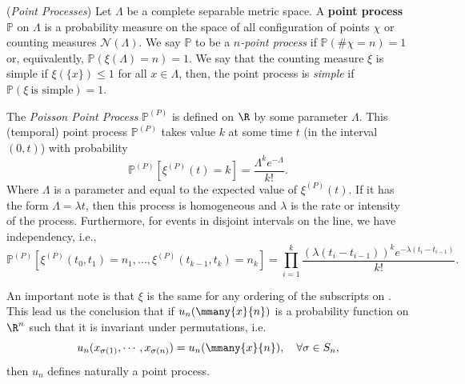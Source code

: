 \begin{definicao} (\textit{Point Processes})
	Let $\Lambda$ be a complete separable metric space. A \textbf{point process} $\mathbb{P}$ on $\Lambda$ is a probability measure on the space of all configuration of points $\chi$ or counting measures $\mathcal{N}(\Lambda)$. We say $\mathbb{P}$ to be a \textit{$n$-point process} if  $\mathbb{P}(\# \chi = n) = 1$ or, equivalently, $\mathbb{P}(\xi(\Lambda) = n)  = 1$. We say that the counting measure $\xi$ is simple if $\xi(\{x\}) \leq 1$ for all $x \in \Lambda$, then, the point process is \textit{simple} if $\mathbb{P}( \xi \ \text{is simple}) = 1$.
	\label{Definition: Point Process}
\end{definicao}

\begin{exemplo}
The \textit{Poisson Point Process} $\mathbb{P}^{(P)}$ is defined on $\R$ by some parameter $\Lambda$. This (temporal) point process $\mathbb{P}^{(P)}$ takes value $k$ at some time $t$ (in the interval $(0,t)$) with probability
\begin{equation}
	\mathbb{P}^{(P)}[\xi^{(P)}(t) = k] = \frac{\Lambda^k e^{-\Lambda}}{k!}.
\end{equation}
Where $\Lambda$ is a parameter and equal to the expected value of $\xi^{(P)}(t)$. If it has the form $\Lambda = \lambda t$, then this process is homogeneous and $\lambda$ is the rate or intensity of the process.  Furthermore, for events in disjoint intervals on the line, we have independency, i.e.,
\begin{equation}
	\mathbb{P}^{(P)}[\xi^{(P)}(t_0, t_1) = n_1, \dots, \xi^{(P)}(t_{k-1}, t_k) = n_k] = \prod_{i=1}^{k} \frac{(\lambda (t_{i} - t_{i-1}))^k e^{-\lambda (t_{i} - t_{i-1})}}{k!}.
\end{equation}
\end{exemplo}

An important note is that $\xi$ is the same for any ordering of the subscripts on . This lead us the conclusion that if $u_n(\mmany{x}{n})$ is a probability function on $\R^n$ such that it is invariant under permutations, i.e.
\begin{equation}
	u_n(x_{\sigma(1)}, \cdots, x_{\sigma(n)}) = u_n(\mmany{x}{n}), \quad \forall \sigma \in S_n,
\end{equation}
then $u_n$ defines naturally a point process.

